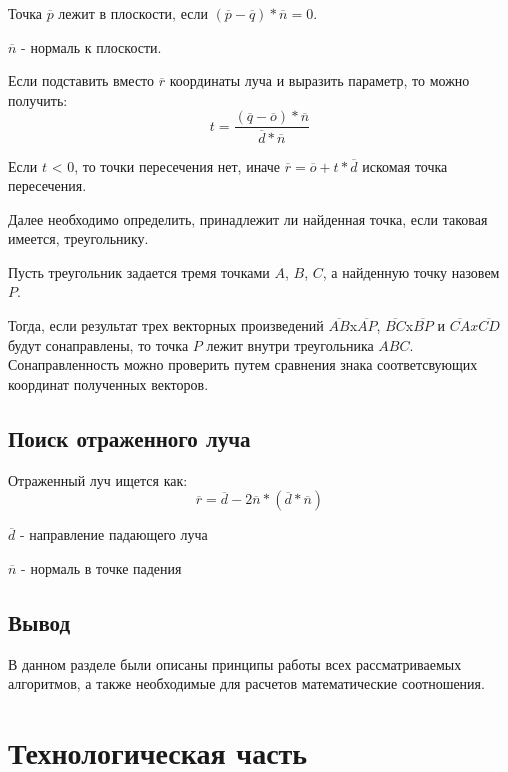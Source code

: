 \documentclass[12pt]{report}
\begin{document}
	Точка $\overline{p}$ лежит в плоскости, если $(\overline{p} - \overline{q})*\overline{n} = 0$. 
	
	$\overline{n}$ - нормаль к плоскости.
	
	Если подставить вместо $\overline{r}$ координаты луча и выразить параметр, то можно получить:
	\begin{equation}
		t = \frac{(\overline{q} - \overline{o})*\overline{n}}{\overline{d}*\overline{n}}
	\end{equation}
	
	Если $t$ < 0, то точки пересечения нет, иначе $\overline{r} = \overline{o} + t*\overline{d}$ искомая точка пересечения.
	
	Далее необходимо определить, принадлежит ли найденная точка, если таковая имеется, треугольнику.
	
	Пусть треугольник задается тремя точками $A$, $B$, $C$, а найденную точку назовем $P$.
	
	Тогда, если результат трех векторных произведений $\overline{AB}$x$\overline{AP}$, $\overline{BC}$x$\overline{BP}$ и $\overline{CA}x\overline{CD}$ будут сонаправлены, то точка $P$ лежит внутри треугольника $ABC$. Сонаправленность можно проверить путем сравнения знака соответсвующих координат полученных векторов.
	
	\section{Поиск отраженного луча}

	Отраженный луч ищется как:
	\begin{equation}
		\overline{r} = \overline{d} - 2\overline{n}*(\overline{d}*\overline{n})
	\end{equation}
	
	$\overline{d}$ - направление падающего луча
	
	$\overline{n}$ - нормаль в точке падения

	\section*{Вывод}

	В данном разделе были описаны принципы работы всех рассматриваемых алгоритмов, а также необходимые для расчетов математические соотношения.
	
	\chapter{Технологическая часть}
	
\end{document}
